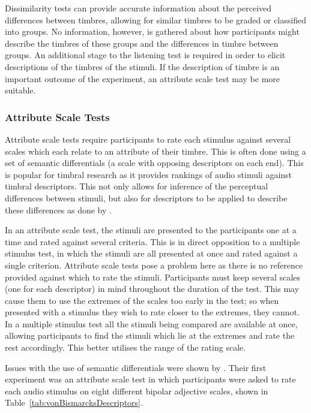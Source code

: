 			Dissimilarity tests can provide accurate information about the perceived differences between
			timbres, allowing for similar timbres to be graded or classified into groups. No information,
			however, is gathered about how participants might describe the timbres of these groups and the
			differences in timbre between groups. An additional stage to the listening test is required in
			order to elicit descriptions of the timbres of the stimuli. If the description of timbre is an
			important outcome of the experiment, an attribute scale test may be more suitable.
			
		\subsubsection*{Attribute Scale Tests}
			Attribute scale tests require participants to rate each stimulus against several scales which each
			relate to an attribute of their timbre. This is often done using a set of semantic differentials (a
			scale with opposing descriptors on each end). This is popular for timbral research as it provides
			rankings of audio stimuli against timbral descriptors. This not only allows for inference of the
			perceptual differences between stimuli, but also for descriptors to be applied to describe these
			differences as done by \citet{zacharakis2014an}. 			
			
			In an attribute scale test, the stimuli are presented to the participants one at a time and rated
			against several criteria. This is in direct opposition to a multiple stimulus test, in which the
			stimuli are all presented at once and rated against a single criterion. Attribute scale tests pose
			a problem here as there is no reference provided against which to rate the stimuli. Participants
			must keep several scales (one for each descriptor) in mind throughout the duration of the test.
			This may cause them to use the extremes of the scales too early in the test; so when presented with
			a stimulus they wish to rate closer to the extremes, they cannot. In a multiple stimulus test all
			the stimuli being compared are available at once, allowing participants to find the stimuli which
			lie at the extremes and rate the rest accordingly. This better utilises the range of the
			rating scale. 
			
			Issues with the use of semantic differentials were shown by \citet{kendall1993verbal1}. Their first
			experiment was an attribute scale test in which participants were asked to rate each audio stimulus
			on eight different bipolar adjective scales, shown in Table~\ref{tab:vonBismarcksDescriptors}.

